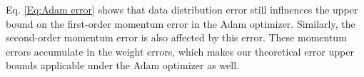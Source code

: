 Eq. \eqref{Eq:Adam error} shows that data distribution error still influences the upper bound on the first-order momentum error in the Adam optimizer. Similarly, the second-order momentum error is also affected by this error. These momentum errors accumulate in the weight errors, which makes our theoretical error upper bounds applicable under the Adam optimizer as well.






